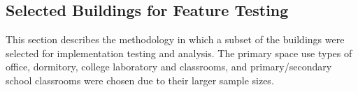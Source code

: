 \subsection{Selected Buildings for Feature Testing}

This section describes the methodology in which a subset of the buildings were selected for implementation testing and analysis. The primary space use types of office, dormitory, college laboratory and classrooms, and primary/secondary school classrooms were chosen due to their larger sample sizes.